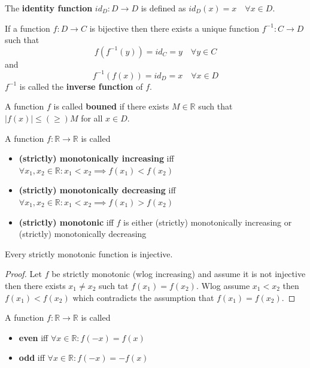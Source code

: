 \begin{definition}
    The \textbf{identity function} $id_D: D \to D$ is defined as $id_D(x) = x \quad \forall x \in D$.
\end{definition}

\begin{definition}
    If a function $f: D \to C$ is bijective then there exists a unique function $f^{-1}: C \to D$ such that
    $$f(f^{-1}(y)) = id_C = y \quad \forall y \in C$$
    and
    $$f^{-1}(f(x)) = id_D = x \quad \forall x \in D$$
    $f^{-1}$ is called the \textbf{inverse function} of $f$.
\end{definition}

\begin{definition}
    A function $f$ is called \textbf{bouned} if there exists $M \in \mathbb{R}$ such that $|f(x)| \leq(\geq) M$ for all $x \in D$.
\end{definition}

\begin{definition}
    A function  $f: \mathbb{R} \to \mathbb{R}$ is called 
    \begin{itemize}
        \item \textbf{(strictly) monotonically increasing} iff $\forall x_1, x_2 \in \mathbb{R} : x_1 < x_2 \implies f(x_1) < f(x_2)$
        \item \textbf{(strictly) monotonically decreasing} iff $\forall x_1, x_2 \in \mathbb{R} : x_1 < x_2 \implies f(x_1) > f(x_2)$
        \item \textbf{(strictly) monotonic} iff $f$ is either (strictly) monotonically increasing or (strictly) monotonically decreasing
    \end{itemize}
\end{definition}

\begin{theorem}
    Every strictly monotonic function is injective.
\end{theorem}

\begin{proof}
    Let $f$ be strictly monotonic (wlog increasing) and assume it is not injective then there exists $x_1 \neq x_2$ such tat $f(x_1) = f(x_2)$. Wlog assume $x_1 < x_2$ then $f(x_1) < f(x_2)$ which contradicts the assumption that $f(x_1) = f(x_2)$.
\end{proof}

\begin{definition}
    A function $f: \mathbb{R} \to \mathbb{R}$ is called 
    \begin{itemize}
        \item \textbf{even} iff $\forall x \in \mathbb{R} : f(-x) = f(x)$
        \item \textbf{odd} iff $\forall x \in \mathbb{R} : f(-x) = -f(x)$
    \end{itemize}
\end{definition}

